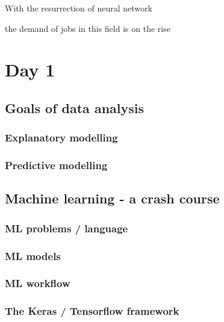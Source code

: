 \documentclass[a4paper,twoside]{tufte-book}\usepackage[]{graphicx}\usepackage[]{color}
\begin{document}
With the resurrection of neural network

the demand of jobs in this field is on the rise


\chapter{Day 1} %

\section{Goals of data analysis}

\subsection{Explanatory modelling}

\subsection{Predictive modelling}


\section{Machine learning - a crash course}

\subsection{ML problems / language}



\subsection{ML models}



\subsection{ML workflow}


\subsection{The Keras / Tensorflow framework}
\end{document}

